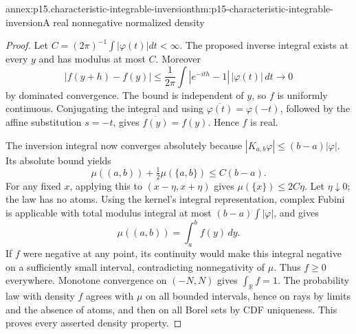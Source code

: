 \begin{annexitem}{annex:p15.characteristic-integrable-inversion}{thm:p15-characteristic-integrable-inversion}{A real nonnegative normalized density}
\begin{proof}
Let \(C=(2\pi)^{-1}\int|\varphi(t)|dt<\infty\).
The proposed inverse integral exists at every \(y\)
and has modulus at most \(C\).
Moreover
\[
 |f(y+h)-f(y)|
 \leq\frac1{2\pi}\int|e^{-ith}-1|\,|\varphi(t)|\,dt
                   \longrightarrow0
\]
by dominated convergence. The bound is independent
of \(y\), so \(f\) is uniformly continuous.
Conjugating the integral and using
\(\overline{\varphi(t)}=\varphi(-t)\), followed by
the affine substitution \(s=-t\), gives
\(\overline{f(y)}=f(y)\). Hence \(f\) is real.

The inversion integral now converges absolutely because
\(|K_{a,b}\varphi|\leq(b-a)|\varphi|\).
Its absolute bound yields
\[
 \mu((a,b))+\tfrac12\mu(\{a,b\})\leq C(b-a).
\]
For any fixed \(x\), applying this to \((x-\eta,x+\eta)\)
gives \(\mu(\{x\})\leq2C\eta\).
Let \(\eta\downarrow0\); the law has no atoms.
Using the kernel's integral representation, complex
Fubini is applicable with total modulus integral
at most \((b-a)\int|\varphi|\), and gives
\[
 \mu((a,b))=\int_a^b f(y)\,dy.
\]
If \(f\) were negative at any point, its continuity
would make this integral negative on a sufficiently
small interval, contradicting nonnegativity of \(\mu\).
Thus \(f\geq0\) everywhere. Monotone convergence on
\((-N,N)\) gives \(\int_{\mathbb R}f=1\).
The probability law with density \(f\) agrees with
\(\mu\) on all bounded intervals, hence on rays by
limits and the absence of atoms, and then on all Borel
sets by CDF uniqueness. This proves every asserted
density property.
\end{proof}
\end{annexitem}

